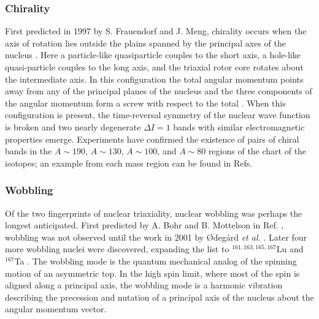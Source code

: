\subsubsection{Chirality}
\label{sssec:intro-rot-chiral}
First predicted in 1997  by S. Frauendorf and J. Meng, chirality occurs when the axis of rotation lies outside the plains spanned by the principal axes of the nucleus \cite{frauendorfChirality,chiralityOfNuclearRotation,frauendorfTAC}. Here a particle-like quasiparticle couples to the short axis, a hole-like quasi-particle couples to the long axis, and the triaxial rotor core rotates about the intermediate axis. In this configuration the total angular momentum points away from any of the principal planes of the nucleus and the three components of the angular momentum form a screw with respect to the total \cite{frauendorfChirality}.  When this configuration is present, the time-reversal symmetry of the nuclear wave function is broken and two nearly degenerate $\Delta{}I=1$ bands with similar electromagnetic properties emerge. Experiments have confirmed the existence of pairs of chiral bands in the $A\sim{}190$, $A\sim{}130$, $A\sim{}100$, and  $A\sim{}80$ regions of the chart of the isotopes; an example from each mass region can be found in Refs. \cite{chiralityMore135Nd,chiralityIn104Rh,chiralityIn188Ir,chiralityIn80Br}

\subsubsection{Wobbling}
\label{sssec:intro-rot-wob}
Of the two fingerprints of nuclear triaxiality, nuclear wobbling was perhaps the longest anticipated. First predicted by A. Bohr and B. Mottelson in Ref. \cite{bohrMottelson2}, wobbling was not observed until the work in 2001 by \O{}deg\aa{}rd \emph{et al.} \cite{wobblingIn163Lu}. Later four more wobbling nuclei were discovered, expanding the list to $^{161,163,165,167}$Lu and $^{167}$Ta \cite{wobblingIn163Lu,wobblingIn163LuTwoPhonon,wobblingIn165Lu,wobblingIn167Lu,wobblingIn161Lu,wobblingIn167Ta}. The wobbling mode is the quantum mechanical analog of the spinning motion of an asymmetric top. In the high spin limit, where most of the spin is aligned along a principal axis, the wobbling mode is a harmonic vibration describing the precession and nutation of a principal axis of the nucleus about the angular momentum vector.

